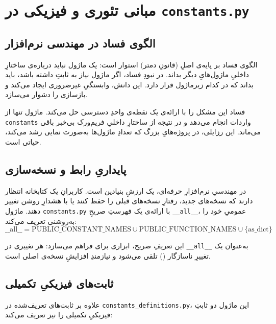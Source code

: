 \section{مبانی تئوری و فیزیکی در \texttt{constants.py}}

\subsection{الگوی فساد در مهندسی نرم‌افزار}

الگوی فساد بر پایه‌ی اصلِ  (قانونِ دمتر) استوار است: یک ماژول نباید درباره‌ی ساختارِ داخلیِ ماژول‌هایِ دیگر بداند. در نبودِ فساد، اگر ماژول  نیاز به ثابتِ  داشته باشد، باید بداند که  در کدام زیرماژول قرار دارد. این دانش، وابستگیِ غیرضروری ایجاد می‌کند و بازسازی را دشوار می‌سازد.

فساد این مشکل را با ارائه‌ی یک نقطه‌ی واحدِ دسترسی حل می‌کند. ماژول  تنها از \texttt{constants} واردات انجام می‌دهد و در نتیجه از ساختارِ داخلیِ فریم‌ورک بی‌خبر باقی می‌ماند. این رزایلی، در پروژه‌هایِ بزرگ که تعدادِ ماژول‌ها به‌صورت نمایی رشد می‌کند، حیاتی است.

\subsection{پایداریِ رابط و نسخه‌سازی}

در مهندسیِ نرم‌افزارِ حرفه‌ای،  یک ارزشِ بنیادین است. کاربرانِ یک کتابخانه انتظار دارند که نسخه‌های جدید، رفتارِ نسخه‌های قبلی را حفظ کنند یا با هشدارِ روشن تغییر دهند. ماژول \texttt{constants.py} با ارائه‌ی یک فهرستِ صریحِ \texttt{\_\_all\_\_}،  عمومیِ خود را به‌روشنی تعریف می‌کند:
\begin{equation}
	\text{\_\_all\_\_} = \text{PUBLIC\_CONSTANT\_NAMES} \cup \text{PUBLIC\_FUNCTION\_NAMES} \cup \{\text{as\_dict}\}
\end{equation}

این تعریفِ صریح، ابزاری برای  فراهم می‌سازد: هر تغییری در \texttt{\_\_all\_\_} به‌عنوان یک تغییرِ ناسازگار () تلقی می‌شود و نیازمندِ افزایشِ نسخه‌ی اصلی است.

\subsection{ثابت‌های فیزیکیِ تکمیلی}

علاوه بر ثابت‌های تعریف‌شده در \texttt{constants\_definitions.py}، این ماژول دو ثابتِ فیزیکیِ تکمیلی را نیز تعریف می‌کند:


